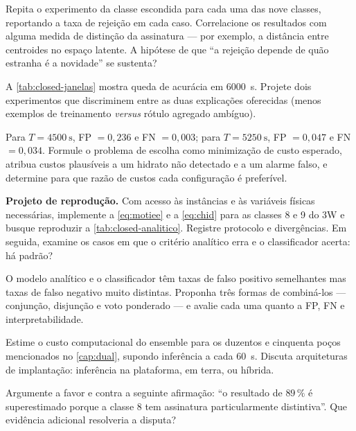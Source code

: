 \begin{exercicios}
\item Repita o experimento da classe escondida para cada uma das nove classes,
      reportando a taxa de rejeição em cada caso. Correlacione os resultados com alguma
      medida de distinção da assinatura --- por exemplo, a distância entre centroides no
      espaço latente. A hipótese de que ``a rejeição depende de quão estranha é a
      novidade'' se sustenta?

\item A \cref{tab:closed-janelas} mostra queda de acurácia em \SI{6000}{\second}.
      Projete dois experimentos que discriminem entre as duas explicações oferecidas
      (menos exemplos de treinamento \emph{versus} rótulo agregado ambíguo).

\item Para $T = \SI{4500}{\second}$, FP $= 0{,}236$ e FN $= 0{,}003$; para
      $T = \SI{5250}{\second}$, FP $= 0{,}047$ e FN $= 0{,}034$. Formule o problema de
      escolha como minimização de custo esperado, atribua custos plausíveis a um hidrato
      não detectado e a um alarme falso, e determine para que razão de custos cada
      configuração é preferível.

\item \textbf{Projeto de reprodução.} Com acesso às instâncias e às variáveis físicas
      necessárias, implemente a \cref{eq:motiee} e a \cref{eq:chid} para as classes 8 e
      9 do 3W e busque reproduzir a \cref{tab:closed-analitico}. Registre protocolo e
      divergências. Em seguida, examine os casos em que o critério analítico erra e o
      classificador acerta: há padrão?

\item O modelo analítico e o classificador têm taxas de falso positivo semelhantes mas
      taxas de falso negativo muito distintas. Proponha três formas de combiná-los ---
      conjunção, disjunção e voto ponderado --- e avalie cada uma quanto a FP, FN e
      interpretabilidade.

\item Estime o custo computacional do ensemble para os duzentos e cinquenta poços
      mencionados no \cref{cap:dual}, supondo inferência a cada \SI{60}{\second}. Discuta
      arquiteturas de implantação: inferência na plataforma, em terra, ou híbrida.

\item Argumente a favor e contra a seguinte afirmação: ``o resultado de $89\,\%$ é
      superestimado porque a classe 8 tem assinatura particularmente distintiva''. Que
      evidência adicional resolveria a disputa?
\end{exercicios}

